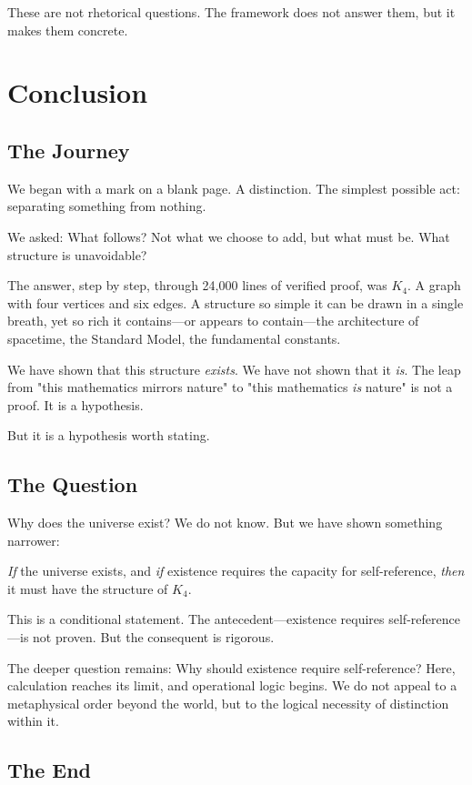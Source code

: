 \documentclass[11pt,a4paper]{book}
\begin{document}
These are not rhetorical questions. The framework does not answer them, but it makes them concrete.

\chapter{Conclusion}

\section{The Journey}

We began with a mark on a blank page. A distinction. The simplest possible act: separating something from nothing.

We asked: What follows? Not what we choose to add, but what must be. What structure is unavoidable?

The answer, step by step, through 24,000 lines of verified proof, was $K_4$. A graph with four vertices and six edges. A structure so simple it can be drawn in a single breath, yet so rich it contains—or appears to contain—the architecture of spacetime, the Standard Model, the fundamental constants.

We have shown that this structure \emph{exists}. We have not shown that it \emph{is}. The leap from "this mathematics mirrors nature" to "this mathematics \emph{is} nature" is not a proof. It is a hypothesis.

But it is a hypothesis worth stating.

\section{The Question}

Why does the universe exist? We do not know. But we have shown something narrower:

\emph{If} the universe exists, and \emph{if} existence requires the capacity for self-reference, \emph{then} it must have the structure of $K_4$.

This is a conditional statement. The antecedent—existence requires self-reference—is not proven. But the consequent is rigorous.

The deeper question remains: Why should existence require self-reference? Here, calculation reaches its limit, and operational logic begins. We do not appeal to a metaphysical order beyond the world, but to the logical necessity of distinction within it.

\section{The End}
\end{document}
